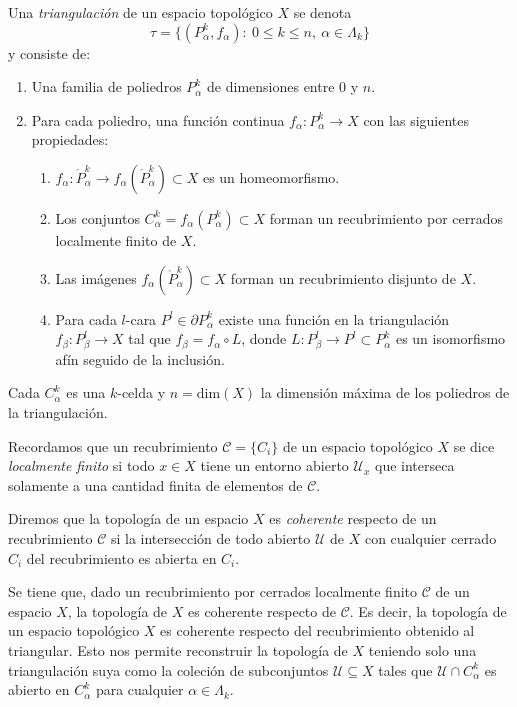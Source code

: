 \begin{definition}
    Una \textit{triangulación} de un espacio topológico $X$ se denota 
    \begin{equation*}
        \tau = \{(P^k_{\alpha}, f_{\alpha}): ~0\le k \le n, ~\alpha\in \Lambda_k\}
    \end{equation*}
    y consiste de:
    \begin{enumerate}
        \item Una familia de poliedros $P^k_{\alpha}$ de dimensiones entre $0$ y $n$.
        \item Para cada poliedro, una función continua $f_{\alpha}:P^k_{\alpha}\to X$ con las siguientes propiedades:
        \begin{enumerate}
            \item $f_{\alpha}: \mathring{P}^k_{\alpha}\to f_{\alpha}(\mathring{P}^k_{\alpha})\subset X$ es un homeomorfismo.
            \item Los conjuntos $C^k_{\alpha}=f_{\alpha}(P^k_{\alpha})\subset X$ forman un recubrimiento por cerrados localmente finito de $X$.
            \item Las imágenes $f_{\alpha}(\mathring{P}^k_{\alpha})\subset X$ forman un recubrimiento disjunto de $X$.
            \item Para cada $l$-cara $P^l\in \partial P^k_{\alpha}$ existe una función en la triangulación $f_{\beta}:P^l_{\beta}\to X$ tal que $f_{\beta} = f_{\alpha}\circ L$, donde $L: P^l_{\beta}\to P^l\subset P^k_{\alpha}$ es un isomorfismo afín seguido de la inclusión.
        \end{enumerate}
    \end{enumerate}
\end{definition}

\bigskip

Cada $C^k_{\alpha}$ es una $k$-celda y $n=\text{dim}(X)$ la dimensión máxima de los poliedros de la triangulación.

Recordamos que un recubrimiento $\mathcal{C}=\{C_i\}$ de un espacio topológico $X$ se dice \textit{localmente finito} si todo $x\in X$ tiene un entorno abierto $\mathcal{U}_x$ que interseca solamente a una cantidad finita de elementos de $\mathcal{C}$. 

Diremos que la topología de un espacio $X$ es \textit{coherente} respecto de un recubrimiento $\mathcal{C}$ si la intersección de todo abierto $\mathcal{U}$ de $X$ con cualquier cerrado $C_i$ del recubrimiento es abierta en $C_i$.

Se tiene que, dado un recubrimiento por cerrados localmente finito $\mathcal{C}$ de un espacio $X$, la topología de $X$ es coherente respecto de $\mathcal{C}$. Es decir, la topología de un espacio topológico $X$ es coherente respecto del recubrimiento obtenido al triangular. Esto nos permite reconstruir la topología de $X$ teniendo solo una triangulación suya como la coleción de subconjuntos $\mathcal{U}\subseteq X$ tales que $\mathcal{U}\cap C^k_{\alpha}$ es abierto en $C^k_{\alpha}$ para cualquier $\alpha\in \Lambda_k$.

